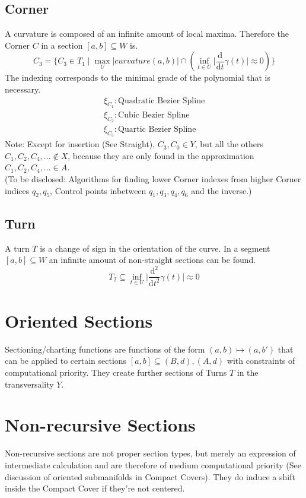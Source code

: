 \documentclass{report}
\begin{document}
\subsection{Corner}
A curvature is composed of an infinite amount of local maxima. Therefore the Corner $C$ in a section $[a,b] \subseteq W$ is.
\begin{equation}
C_{3} = \{C_{3} \in T_{1} \mid \max_{U}\lvert curvature(a,b) \rvert \cap (\inf_{t \in U} \lvert \frac{\mathrm{d}}{\mathrm{d}t}\gamma(t) \rvert \approx 0) \}
\end{equation}
The indexing corresponds to the minimal grade of the polynomial that is necessary.
\begin{align}
\xi_{C_{1}} : \text{Quadratic Bezier Spline}\\
\xi_{C_{2}} : \text{Cubic Bezier Spline}\\
\xi_{C_{3}} : \text{Quartic Bezier Spline}
\end{align}
Note: Except for insertion (See Straight), $C_{3},C_{0} \in Y$, but all the others $C_{1},C_{2},C_{4},... \not\in X$, because they are only found in the approximation $C_{1},C_{2},C_{4},... \in A$.\\
(To be disclosed: Algorithms for finding lower Corner indexes from higher Corner indices $q_{2},q_{5}$, Control points inbetween $q_{1},q_{3},q_{4},q_{6}$ and the inverse.)

\subsection{Turn}
A turn $T$ is a change of sign in the orientation of the curve. In a segment $[a,b] \subseteq W$ an infinite amount of non-straight sections can be found.
\begin{equation}
T_{2} \subseteq \inf_{t \in U} \lvert \frac{\mathrm{d}^2}{\mathrm{d}t^2}\gamma(t) \rvert \approx 0
\end{equation}

\section*{Oriented Sections}
Sectioning/charting functions are functions of the form $(a,b) \mapsto (a,b')$ that can be applied to certain sections $[a,b] \subseteq (B,d),(A,d)$ with constraints of computational priority. They create further sections of Turns $T$ in the transversality $Y$.

\section{Non-recursive Sections}
Non-recursive sections are not proper section types, but merely an expression of intermediate calculation and are therefore of medium computational priority (See discussion of oriented submanifolds in Compact Covers). They do induce a shift inside the Compact Cover if they're not centered.\\\\
\end{document}
